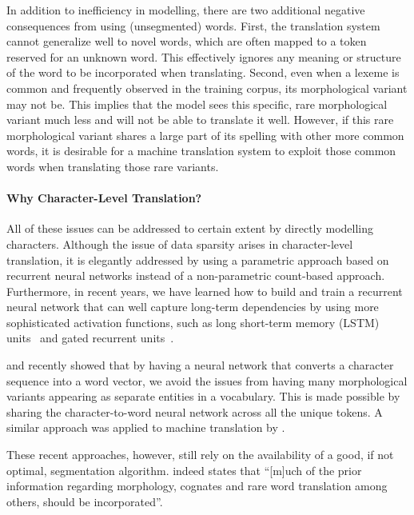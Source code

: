 \documentclass[11pt]{article}
\begin{document}
In addition to inefficiency in modelling, there are two additional negative
consequences from using (unsegmented) words. First, the translation system
cannot generalize well to novel words, which are often mapped to a token reserved for an unknown word.
This effectively ignores any meaning or structure of the word to be
incorporated when translating. Second, even when a lexeme is common and
frequently observed in the training corpus, its morphological variant may not be.
This implies that the model sees this specific, rare morphological variant much
less and will not be able to translate it well.  However, if this rare
morphological variant shares a large part of its spelling with other more common
words, it is desirable for a machine translation system to exploit those common
words when translating those rare variants.

\paragraph{Why Character-Level Translation?}
All of these issues can be addressed to certain extent by directly modelling
characters. Although the issue of data sparsity arises in
character-level translation, it is elegantly addressed by using a parametric
approach based on recurrent neural networks instead of a non-parametric
count-based approach. Furthermore, in recent years, we have learned how to build
and train a recurrent neural network that can well capture long-term
dependencies by using more sophisticated activation functions, such as 
long short-term memory (LSTM) units~\cite{hochreiter1997long} and gated recurrent units~\cite{Cho-et-al-EMNLP2014}.

 and  recently showed that by
having a neural network that converts a character sequence into a word vector,
we avoid the issues from having many morphological variants appearing as
separate entities in a vocabulary.  This is made possible by sharing the
character-to-word neural network across all the unique tokens. A similar
approach was applied to machine translation by .

These recent approaches, however, still rely on the availability of a good, if
not optimal, segmentation algorithm.  indeed states
that ``[m]uch of the prior information regarding morphology, cognates and rare
word translation among others, should be incorporated''.
\end{document}

